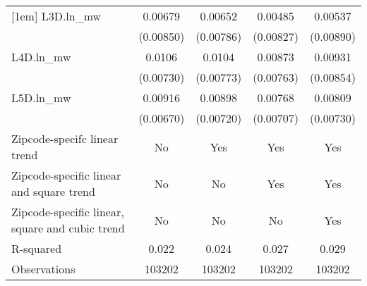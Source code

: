 {\begin{tabular}{l*{4}{c}}
[1em]
L3D.ln\_mw &  0.00679         &  0.00652         &  0.00485         &  0.00537         \\
          &(0.00850)         &(0.00786)         &(0.00827)         &(0.00890)         \\
[1em]
L4D.ln\_mw &   0.0106         &   0.0104         &  0.00873         &  0.00931         \\
          &(0.00730)         &(0.00773)         &(0.00763)         &(0.00854)         \\
[1em]
L5D.ln\_mw &  0.00916         &  0.00898         &  0.00768         &  0.00809         \\
          &(0.00670)         &(0.00720)         &(0.00707)         &(0.00730)         \\
\hline
Zipcode-specifc linear trend&       No         &      Yes         &      Yes         &      Yes         \\
Zipcode-specific linear and square trend&       No         &       No         &      Yes         &      Yes         \\
Zipcode-specific linear, square and cubic trend&       No         &       No         &       No         &      Yes         \\
R-squared &    0.022         &    0.024         &    0.027         &    0.029         \\
Observations&   103202         &   103202         &   103202         &   103202         \\
\hline\hline
\end{tabular}
}
